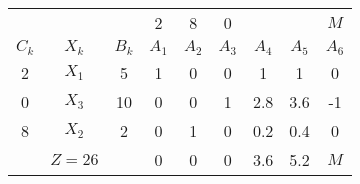     \begin{tabular}{ccccccccc}
    \hline
    \hline
            &         &         & 2       & 8       & 0       &         &         & $M$ \bigstrut[t]\\
    $C_k$   & $X_k$   & $B_k$   & $A_1$   & $A_2$   & $A_3$   & $A_4$   & $A_5$   & $A_6$ \bigstrut[b]\\
    \hline
    2       & $X_1$   & 5       & 1       & 0       & 0       & 1       & 1       & 0 \bigstrut[t]\\
    0       & $X_3$   & 10      & 0       & 0       & 1       & 2.8     & 3.6     & -1 \\
    8       & $X_2$   & 2       & 0       & 1       & 0       & 0.2     & 0.4     & 0 \bigstrut[b]\\
    \hline
            & $Z=26$  &         & 0       & 0       & 0       & 3.6     & 5.2     & $M$ \bigstrut\\
    \hline
    \hline
    \end{tabular}%
